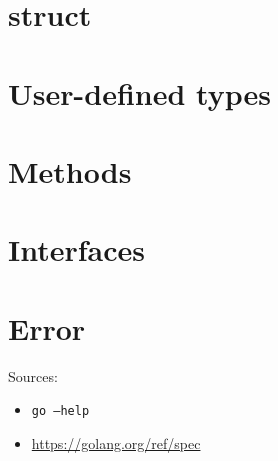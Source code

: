 \documentclass{article}
\begin{document}
\begin{multicols*}{3}
  \filbreak
  \section*{struct}

  \filbreak
  \section*{User-defined types}

  \filbreak
  \section*{Methods}

  \filbreak
  \section*{Interfaces}

  \filbreak
  \section*{Error}

  \parbox{\columnwidth}{
    Sources:
    \begin{itemize}[nosep]
    \item \texttt{go --help}
    \item \url{https://golang.org/ref/spec}
    \end{itemize}

    \vspace{\baselineskip}
    \begin{center}
      \doclicenseText\\[0.25\baselineskip]

      \doclicenseImage
    \end{center}
  }
\end{multicols*}
\end{document}
